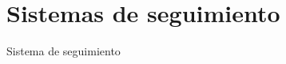 \documentclass[]{beamer}
\begin{document}
\section{Sistemas de seguimiento}
\begin{frame}[t]{Sistema de seguimiento}






\end{frame}
\end{document}

